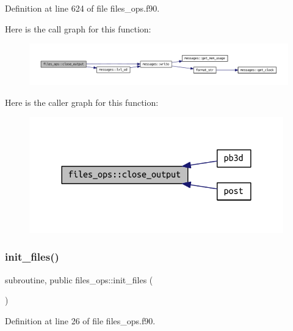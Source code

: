 Definition at line 624 of file files\+\_\+ops.\+f90.

Here is the call graph for this function\+:
\nopagebreak
\begin{figure}[H]
\begin{center}
\leavevmode
\includegraphics[width=350pt]{namespacefiles__ops_a09c55ba39a79fd1e1d9d8af2e08f41cb_cgraph}
\end{center}
\end{figure}
Here is the caller graph for this function\+:
\nopagebreak
\begin{figure}[H]
\begin{center}
\leavevmode
\includegraphics[width=312pt]{namespacefiles__ops_a09c55ba39a79fd1e1d9d8af2e08f41cb_icgraph}
\end{center}
\end{figure}
\mbox{\label{namespacefiles__ops_a1e219b1147f109f758d03bef89d540e8}} 
\subsubsection{\texorpdfstring{init\+\_\+files()}{init\_files()}}
{\footnotesize\ttfamily subroutine, public files\+\_\+ops\+::init\+\_\+files (\begin{DoxyParamCaption}{ }\end{DoxyParamCaption})}



Definition at line 26 of file files\+\_\+ops.\+f90.

